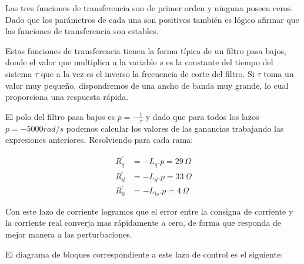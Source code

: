 \documentclass{article}
\begin{document}
Las tres funciones de transferencia son de primer orden y ninguna poseen ceros. Dado que
los parámetros de cada una son positivos también es lógico afirmar que las funciones de 
transferencia son estables.

Estas funciones de transferencia tienen la forma típica de un filtro pasa bajos, donde el valor que
multiplica a la variable $s$ es la constante del tiempo del sistema $\tau$ que a la vez es el inverso
la frecuencia de corte del filtro. Si $\tau$ toma un valor muy pequeño, dispondremos de una ancho de 
banda muy grande, lo cual proporciona una respuesta rápida.

El polo del filtro pasa bajos es $p = -\frac{1}{\tau}$ y dado que para todos los lazos $p = -5000 rad/s$
podemos calcular los valores de las ganancias trabajando las expresiones anteriores.
Resolviendo para cada rama:

\begin{align*}
    R_q^\prime &= -L_q.p = 29\,\Omega  \\
    R_d^\prime &= -L_d.p = 33\,\Omega \\
    R_0^\prime &= -L_{ls}.p = 4\,\Omega
\end{align*}

Con este lazo de corriente logramos que el error entre la consigna de corriente y la corriente real
converja mas rápidamente a cero, de forma que responda de mejor manera a las perturbaciones.

El diagrama de bloques correspondiente a este lazo de control es el siguiente:
\end{document}
